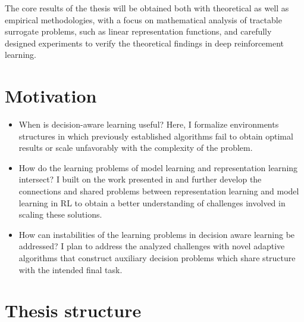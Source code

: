 The core results of the thesis will be obtained both with theoretical as well as empirical methodologies, with a focus on mathematical analysis of tractable surrogate problems, such as linear representation functions, and carefully designed experiments to verify the theoretical findings in deep reinforcement learning.

\section{Motivation}


\begin{itemize}
    \item When is decision-aware learning useful? Here, I formalize environments structures in which previously established algorithms fail to obtain optimal results or scale unfavorably with the complexity of the problem.
    \item How do the learning problems of model learning and representation learning intersect? I built on the work presented in \textcite{voelcker2023lambda} and further develop the connections and shared problems between representation learning and model learning in RL to obtain a better understanding of challenges involved in scaling these solutions.
    \item How can instabilities of the learning problems in decision aware learning be addressed? I plan to address the analyzed challenges with novel adaptive algorithms that construct auxiliary decision problems which share structure with the intended final task.
\end{itemize}

\section{Thesis structure}

